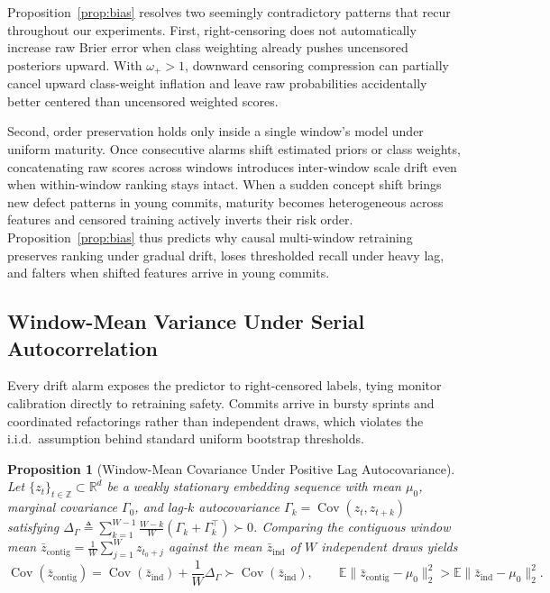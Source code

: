 \documentclass[pdflatex,sn-basic]{sn-jnl}
\theoremstyle{definition}
\theoremstyle{plain}
\newtheorem{proposition}{Proposition}
\begin{document}
Proposition~\ref{prop:bias} resolves two seemingly contradictory patterns that recur throughout our experiments. First, right-censoring does not automatically increase raw Brier error when class weighting already pushes uncensored posteriors upward. With $\omega_+ > 1$, downward censoring compression can partially cancel upward class-weight inflation and leave raw probabilities accidentally better centered than uncensored weighted scores.

Second, order preservation holds only inside a single window's model under uniform maturity. Once consecutive alarms shift estimated priors or class weights, concatenating raw scores across windows introduces inter-window scale drift even when within-window ranking stays intact. When a sudden concept shift brings new defect patterns in young commits, maturity becomes heterogeneous across features and censored training actively inverts their risk order. Proposition~\ref{prop:bias} thus predicts why causal multi-window retraining preserves ranking under gradual drift, loses thresholded recall under heavy lag, and falters when shifted features arrive in young commits.

\subsection{Window-Mean Variance Under Serial Autocorrelation}
\label{sec:theory_alarm_storm}

Every drift alarm exposes the predictor to right-censored labels, tying monitor calibration directly to retraining safety. Commits arrive in bursty sprints and coordinated refactorings rather than independent draws, which violates the i.i.d.\ assumption behind standard uniform bootstrap thresholds.

\begin{proposition}[Window-Mean Covariance Under Positive Lag Autocovariance]
\label{prop:autocorr}
Let $\{z_t\}_{t \in \mathbb{Z}} \subset \mathbb{R}^d$ be a weakly stationary embedding sequence with mean $\mu_0$, marginal covariance $\Gamma_0$, and lag-$k$ autocovariance $\Gamma_k = \operatorname{Cov}(z_t, z_{t+k})$ satisfying $\Delta_\Gamma \triangleq \sum_{k=1}^{W-1}\frac{W-k}{W}(\Gamma_k + \Gamma_k^\top) \succ 0$. Comparing the contiguous window mean $\bar{z}_{\text{contig}} = \frac{1}{W}\sum_{j=1}^W z_{t_0+j}$ against the mean $\bar{z}_{\text{ind}}$ of $W$ independent draws yields
\begin{equation*}
  \operatorname{Cov}(\bar{z}_{\text{contig}}) = \operatorname{Cov}(\bar{z}_{\text{ind}}) + \frac{1}{W}\Delta_\Gamma \succ \operatorname{Cov}(\bar{z}_{\text{ind}}), \qquad
  \mathbb{E}\|\bar{z}_{\text{contig}} - \mu_0\|_2^2 > \mathbb{E}\|\bar{z}_{\text{ind}} - \mu_0\|_2^2.
\end{equation*}
\end{proposition}
\end{document}
